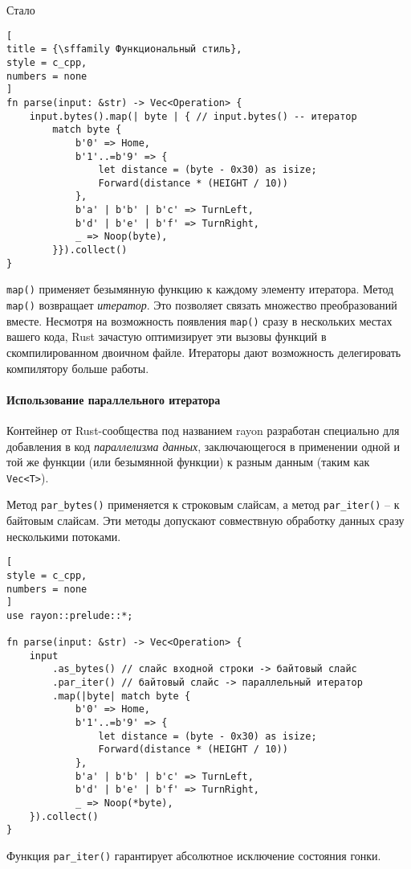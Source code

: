 \documentclass[%
	11pt,
	a4paper,
	utf8,
		]{article}
\begin{document}
Стало
\begin{lstlisting}[
title = {\sffamily Функциональный стиль},
style = c_cpp,
numbers = none
]
fn parse(input: &str) -> Vec<Operation> {
    input.bytes().map(| byte | { // input.bytes() -- итератор
    	match byte {
    	    b'0' => Home,
    	    b'1'..=b'9' => {
    	        let distance = (byte - 0x30) as isize;
    	        Forward(distance * (HEIGHT / 10))
            },
            b'a' | b'b' | b'c' => TurnLeft,
            b'd' | b'e' | b'f' => TurnRight,
            _ => Noop(byte),
        }}).collect()
}
\end{lstlisting}

\verb|map()| применяет безымянную функцию к каждому элементу итератора. Метод \verb|map()| возвращает \emph{итератор}. Это позволяет связать множество преобразований вместе. Несмотря на возможность появления \verb|map()| сразу в нескольких местах вашего кода, Rust зачастую оптимизирует эти вызовы функций в скомпилированном двоичном файле. Итераторы дают возможность делегировать компилятору больше работы.

\paragraph{Использование параллельного итератора} Контейнер от Rust-сообщества под названием rayon разработан специально для добавления в код \emph{параллелизма данных}, заключающегося в применении одной и той же функции (или безымянной функции) к разным данным (таким как \verb|Vec<T>|).

Метод \verb|par_bytes()| применяется к строковым слайсам, а метод \verb|par_iter()| -- к байтовым слайсам. Эти методы допускают совмествную обработку данных сразу несколькими потоками.

\begin{lstlisting}[
style = c_cpp,
numbers = none
]
use rayon::prelude::*;

fn parse(input: &str) -> Vec<Operation> {
    input
        .as_bytes() // слайс входной строки -> байтовый слайс
        .par_iter() // байтовый слайс -> параллельный итератор
        .map(|byte| match byte {
        	b'0' => Home,
        	b'1'..=b'9' => {
        	    let distance = (byte - 0x30) as isize;
        	    Forward(distance * (HEIGHT / 10))
            },
            b'a' | b'b' | b'c' => TurnLeft,
            b'd' | b'e' | b'f' => TurnRight,
            _ => Noop(*byte),
    }).collect()
}
\end{lstlisting}

Функция \verb|par_iter()| гарантирует абсолютное исключение состояния гонки.
\end{document}

